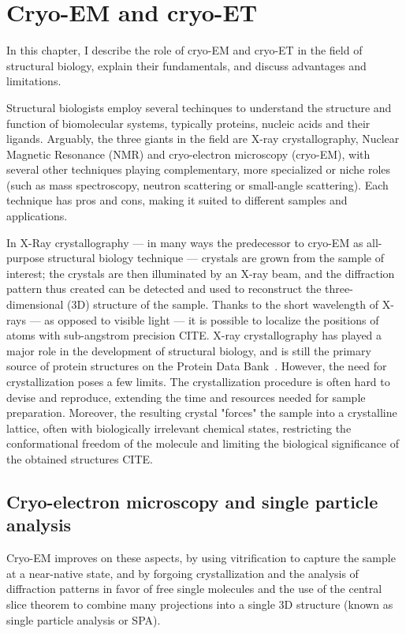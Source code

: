 \chapter{Cryo-EM and cryo-ET}

In this chapter, I describe the role of cryo-EM and cryo-ET in the field of structural biology, explain their fundamentals, and discuss advantages and limitations.

Structural biologists employ several techinques to understand the structure and function of biomolecular systems, typically proteins, nucleic acids and their ligands. Arguably, the three giants in the field are X-ray crystallography, Nuclear Magnetic Resonance (NMR) and cryo-electron microscopy (cryo-EM), with several other techniques playing complementary, more specialized or niche roles (such as mass spectroscopy, neutron scattering or small-angle scattering). Each technique has pros and cons, making it suited to different samples and applications.

In X-Ray crystallography --- in many ways the predecessor to cryo-EM as all-purpose structural biology technique --- crystals are grown from the sample of interest; the crystals are then illuminated by an X-ray beam, and the diffraction pattern thus created can be detected and used to reconstruct the three-dimensional (3D) structure of the sample. Thanks to the short wavelength of X-rays --- as opposed to visible light --- it is possible to localize the positions of atoms with sub-angstrom precision CITE.
X-ray crystallography has played a major role in the development of structural biology, and is still the primary source of protein structures on the Protein Data Bank~\cite{bermanProteinDataBank2000,bermanAnnouncingWorldwideProtein2003}. However, the need for crystallization poses a few limits. The crystallization procedure is often hard to devise and reproduce, extending the time and resources needed for sample preparation. Moreover, the resulting crystal "forces" the sample into a crystalline lattice, often with biologically irrelevant chemical states, restricting the conformational freedom of the molecule and limiting the biological significance of the obtained structures CITE.

\section{Cryo-electron microscopy and single particle analysis}

Cryo-EM improves on these aspects, by using vitrification to capture the sample at a near-native state, and by forgoing crystallization and the analysis of diffraction patterns in favor of free single molecules and the use of the central slice theorem to combine many projections into a single 3D structure (known as single particle analysis or SPA).

